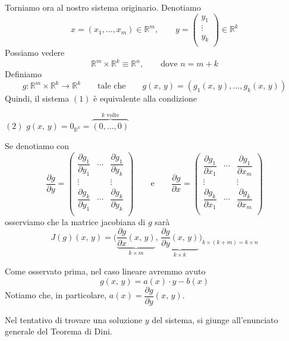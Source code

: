 Torniamo ora al nostro sistema originario. Denotiamo
$$
x = (x_1,\ldots,x_m) \in \mathbb{R}^m, \qquad
y = \left(
\begin{array}{c}
y_1\\
\vdots\\
y_k\\
\end{array}
\right) \in \mathbb{R}^k
$$
Possiamo vedere
$$
\mathbb{R}^m \times \mathbb{R}^k \equiv \mathbb{R}^n, \qquad \text{dove } n = m + k
$$
Definiamo
$$
g : \mathbb{R}^m \times \mathbb{R}^k \longrightarrow \mathbb{R}^k
\qquad \text{tale che} \qquad
g(x,\,y) = (g_1(x,\,y),\ldots,g_k(x,\,y))
$$
Quindi, il sistema $\mathrm{(1)}$ è equivalente alla condizione
\begin{center}
$\mathrm{(2)}$
\hfill
$\displaystyle
g(x,\,y) = 0_{\mathbb{R}^k} = \overbrace{(0,\ldots,0)}^{k \text{ volte}}
$
\hfill \null \\
\end{center}
Se denotiamo con
$$
\frac{\partial g}{\partial y} = \left(
\begin{array}{ccc}
\dfrac{\partial g_1}{\partial y_1} & \cdots & \dfrac{\partial g_1}{\partial y_k}\\
\vdots & & \vdots\\
\dfrac{\partial g_k}{\partial y_1} & \cdots & \dfrac{\partial g_k}{\partial y_k}\\
\end{array}
\right)
\qquad \text{e} \qquad
\frac{\partial g}{\partial x} = \left(
\begin{array}{ccc}
\dfrac{\partial g_1}{\partial x_1} & \cdots & \dfrac{\partial g_1}{\partial x_m}\\
\vdots & & \vdots\\
\dfrac{\partial g_k}{\partial x_1} & \cdots & \dfrac{\partial g_k}{\partial x_m}\\
\end{array}
\right)
$$
osserviamo che la matrice jacobiana di $g$ sarà
$$
J(g)(x,\,y) = \Bigg(
\underbrace{\frac{\partial g}{\partial x}(x,\,y)}_{k \times m},\,
\underbrace{\frac{\partial g}{\partial y}(x,\,y)}_{k \times k}
\Bigg)_{k \times (k+m) = k \times n}
$$

\begin{obs}
Come osservato prima, nel caso lineare avremmo avuto
$$
g(x,\,y) = a(x) \cdot y - b(x)
$$
Notiamo che, in particolare, $a(x) = \dfrac{\partial g}{\partial y}(x,\,y)$.
\end{obs}

Nel tentativo di trovare una soluzione $y$ del sistema, si giunge all'enunciato generale del Teorema di Dini.

